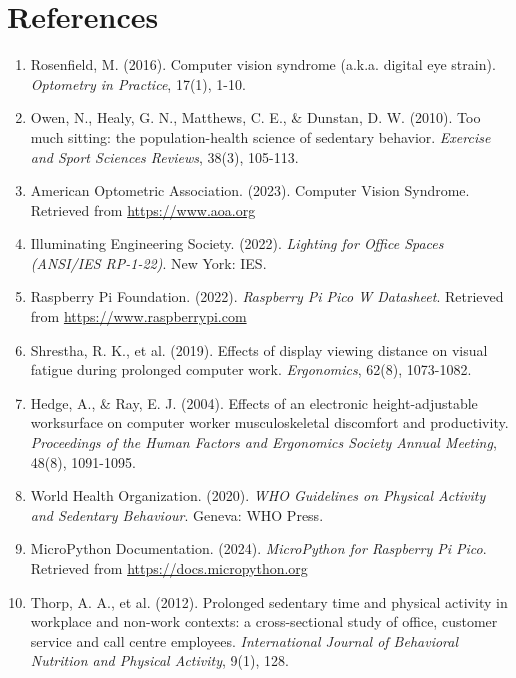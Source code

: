\documentclass[12pt,a4paper]{article}
\begin{document}
\newpage
\section{References}

\begin{enumerate}
\item Rosenfield, M. (2016). Computer vision syndrome (a.k.a. digital eye strain). \textit{Optometry in Practice}, 17(1), 1-10.

\item Owen, N., Healy, G. N., Matthews, C. E., \& Dunstan, D. W. (2010). Too much sitting: the population-health science of sedentary behavior. \textit{Exercise and Sport Sciences Reviews}, 38(3), 105-113.

\item American Optometric Association. (2023). Computer Vision Syndrome. Retrieved from \url{https://www.aoa.org}

\item Illuminating Engineering Society. (2022). \textit{Lighting for Office Spaces (ANSI/IES RP-1-22)}. New York: IES.

\item Raspberry Pi Foundation. (2022). \textit{Raspberry Pi Pico W Datasheet}. Retrieved from \url{https://www.raspberrypi.com}

\item Shrestha, R. K., et al. (2019). Effects of display viewing distance on visual fatigue during prolonged computer work. \textit{Ergonomics}, 62(8), 1073-1082.

\item Hedge, A., \& Ray, E. J. (2004). Effects of an electronic height-adjustable worksurface on computer worker musculoskeletal discomfort and productivity. \textit{Proceedings of the Human Factors and Ergonomics Society Annual Meeting}, 48(8), 1091-1095.

\item World Health Organization. (2020). \textit{WHO Guidelines on Physical Activity and Sedentary Behaviour}. Geneva: WHO Press.

\item MicroPython Documentation. (2024). \textit{MicroPython for Raspberry Pi Pico}. Retrieved from \url{https://docs.micropython.org}

\item Thorp, A. A., et al. (2012). Prolonged sedentary time and physical activity in workplace and non-work contexts: a cross-sectional study of office, customer service and call centre employees. \textit{International Journal of Behavioral Nutrition and Physical Activity}, 9(1), 128.

\end{enumerate}
\end{document}
